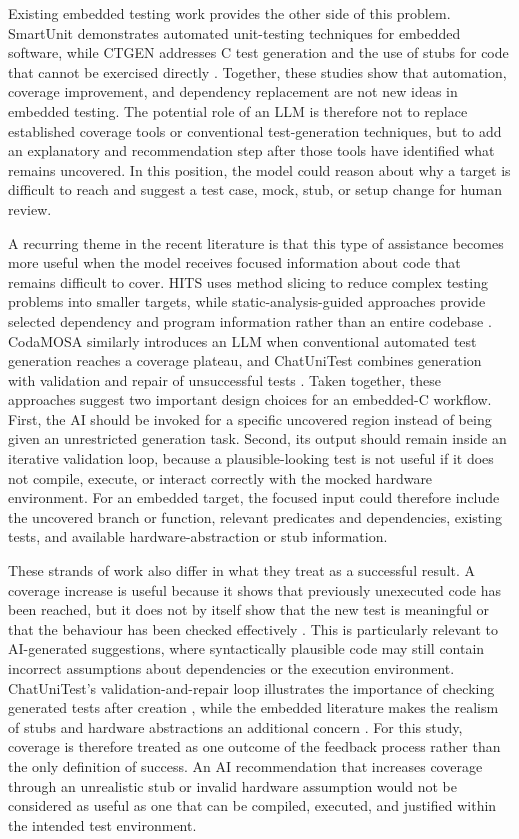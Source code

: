 \documentclass[conference]{IEEEtran}
\begin{document}
Existing embedded testing work provides the other side of this problem.
SmartUnit demonstrates automated unit-testing techniques for embedded software,
while CTGEN addresses C test generation and the use of stubs for code that
cannot be exercised directly \cite{zhang2018,mangels2012}. Together, these studies show that
automation, coverage improvement, and dependency replacement are not new ideas
in embedded testing. The potential role of an LLM is therefore not to replace
established coverage tools or conventional test-generation techniques, but to
add an explanatory and recommendation step after those tools have identified
what remains uncovered. In this position, the model could reason about why a
target is difficult to reach and suggest a test case, mock, stub, or setup
change for human review.

A recurring theme in the recent literature is that this type of assistance
becomes more useful when the model receives focused information about code that
remains difficult to cover. HITS uses method slicing to reduce complex
testing problems into smaller targets, while static-analysis-guided approaches
provide selected dependency and program information rather than an entire
codebase \cite{wang2024hits,chowdhury2024}. CodaMOSA similarly introduces an
LLM when conventional automated test generation reaches a coverage plateau,
and ChatUniTest combines generation with validation and repair of unsuccessful
tests \cite{lemieux2023,chen2024}. Taken together, these approaches suggest two
important design choices for an embedded-C workflow. First, the AI should be
invoked for a specific uncovered region instead of being given an unrestricted
generation task. Second, its output should remain inside an iterative
validation loop, because a plausible-looking test is not useful if it does not
compile, execute, or interact correctly with the mocked hardware environment.
For an embedded target, the focused input could therefore include the uncovered
branch or function, relevant predicates and dependencies, existing tests, and
available hardware-abstraction or stub information.

These strands of work also differ in what they treat as a successful result. A
coverage increase is useful because it shows that previously unexecuted code has
been reached, but it does not by itself show that the new test is meaningful or
that the behaviour has been checked effectively \cite{inozemtseva2014}. This is
particularly relevant to AI-generated suggestions, where syntactically plausible
code may still contain incorrect assumptions about dependencies or the execution
environment. ChatUniTest's validation-and-repair loop illustrates the importance
of checking generated tests after creation \cite{chen2024}, while the embedded
literature makes the realism of stubs and hardware abstractions an additional
concern \cite{garousi2018,mangels2012}. For this study, coverage is therefore
treated as one outcome of the feedback process rather than the only definition
of success. An AI recommendation that increases coverage through an unrealistic
stub or invalid hardware assumption would not be considered as useful as one
that can be compiled, executed, and justified within the intended test
environment.
\end{document}
